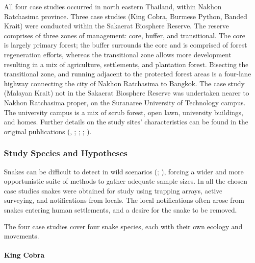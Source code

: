 \documentclass[10pt,a4paper]{article}
\begin{document}
All four case studies occurred in north eastern Thailand, within Nakhon Ratchasima province.
Three case studies (King Cobra, Burmese Python, Banded Krait) were conducted within the Sakaerat Biosphere Reserve.
The reserve comprises of three zones of management: core, buffer, and transitional.
The core is largely primary forest; the buffer surrounds the core and is comprised of forest regeneration efforts, whereas the transitional zone allows more development resulting in a mix of agriculture, settlements, and plantation forest.
Bisecting the transitional zone, and running adjacent to the protected forest areas is a four-lane highway connecting the city of Nakhon Ratchasima to Bangkok.
The case study (Malayan Krait) not in the Sakaerat Biosphere Reserve was undertaken nearer to Nakhon Ratchasima proper, on the Suranaree University of Technology campus.
The university campus is a mix of scrub forest, open lawn, university buildings, and homes.
Further details on the study sites' characteristics can be found in the original publications (, ; ; ; ).

\subsubsection{Study Species and Hypotheses}\label{study-species-and-hypotheses}

Snakes can be difficult to detect in wild scenarios (; ), forcing a wider and more opportunistic suite of methods to gather adequate sample sizes.
In all the chosen case studies snakes were obtained for study using trapping arrays, active surveying, and notifications from locals.
The local notifications often arose from snakes entering human settlements, and a desire for the snake to be removed.

The four case studies cover four snake species, each with their own ecology and movements.

\paragraph{King Cobra}\label{king-cobra}
\end{document}
